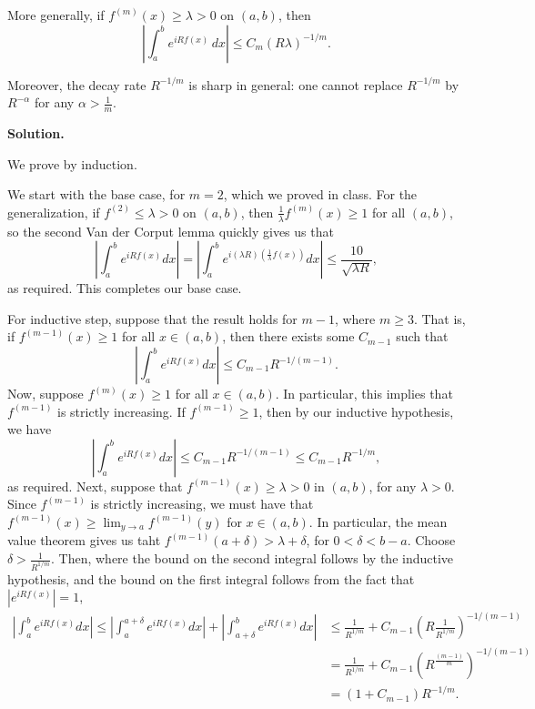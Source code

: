 \documentclass[11pt]{article}
\begin{document}
\begin{enumerate}
More generally, if $f^{(m)}(x) \ge \lambda > 0$ on $(a,b)$, then
\[
\left| \int_a^b e^{i R f(x)} \, dx \right| \le C_m (R\lambda)^{-1/m}.
\]

Moreover, the decay rate $R^{-1/m}$ is sharp in general: one cannot replace $R^{-1/m}$ by $R^{-\alpha}$ for any $\alpha > \frac{1}{m}$.



\textbf{Solution.}

We prove by induction.

We start with the base case, for $m = 2$, which we proved in class.
For the generalization, if $f^{(2)} \leq \lambda > 0$ on $(a, b)$, then $\frac{1}{\lambda} f^{(m)}(x) \geq 1$ for all $(a, b)$, so the second Van der Corput lemma quickly gives us that
\[
\left| \int_{a}^{b} e^{i R f(x)} dx \right|  = \left| \int_{a}^{b} e^{i (\lambda R) ( \frac{1}{\lambda} f(x))} dx \right|   \leq \frac{10}{\sqrt{\lambda R}}
,\] 
as required.
This completes our base case.

For inductive step, suppose that the result holds for $m - 1$, where $m \geq 3$.
That is, if $f^{(m-1)} (x) \geq 1$ for all $x \in (a, b)$, then there exists some $C_{m-1}$ such that
\[
\left| \int_{a}^{b} e^{i R f(x)} dx \right| \leq C_{m-1} R^{-1 / (m-1)}
.\] 
Now, suppose $f^{(m)}(x) \geq 1$ for all $x \in (a, b)$.
In particular, this implies that $f^{(m-1)}$ is strictly increasing.
If $f^{(m-1)} \geq 1$, then by our inductive hypothesis, we have
\[
\left| \int_{a}^{b} e^{i R f(x)} dx \right| \leq C_{m-1} R^{-1 / (m-1)} \leq C_{m-1} R^{-1 /m }
,\] 
as required.
Next, suppose that $f^{(m-1)}(x) \geq \lambda > 0$ in $(a, b)$, for any $\lambda > 0$.
Since $f^{(m-1)}$ is strictly increasing, we must have that $f^{(m-1)}(x) \geq \lim_{y \to a} f^{(m-1)}(y)$ for $x \in (a, b)$.
In particular, the mean value theorem gives us taht $f^{(m-1)}(a + \delta) > \lambda + \delta$, for $0 < \delta < b - a$.
Choose $\delta > \frac{1}{R^{1 / m}}$.
Then, where the bound on the second integral follows by the inductive hypothesis, and the bound on the first integral follows from the fact that $|e^{iRf(x)} | = 1$,
\begin{align*}
    \left| \int_{a}^{b} e^{i R f(x)} dx \right| \leq \left| \int_{a}^{a + \delta} e^{i R f(x)}dx \right|  + \left| \int_{a + \delta}^{b} e^{i R f(x)}dx \right| &\leq \frac{1}{R^{1 / m}} + C_{m-1} (R \frac{1}{R^{1 / m}})^{ -1 / (m-1)}\\
    &=  \frac{1}{R^{1 / m}} + C_{m-1} (R^{\frac{(m-1)}{m}})^{-1 / (m-1)}\\
    &= (1 + C_{m-1}) R^{- 1 / m} 
.\end{align*}


\end{enumerate}
\end{document}
